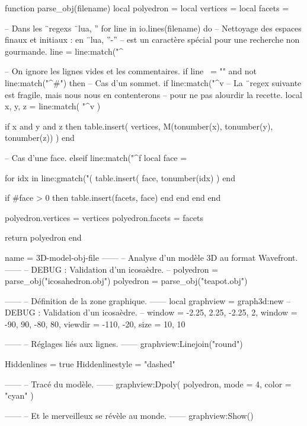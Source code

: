 \documentclass{standalone}
\begin{document}
\begin{luacode}
function parse_obj(filename)
  local polyedron = {}
  local vertices  = {}
  local facets    = {}

-- Dans les ¨regexs ¨lua, ''%
  for line in io.lines(filename) do
-- Nettoyage des espaces finaux et initiaux : en ¨lua, ''-''
-- est un caractère spécial pour une recherche non gourmande.
    line = line:match("^%

-- On ignore les lignes vides et les commentaires.
    if line ~= "" and not line:match("^#") then
-- Cas d'un sommet.
      if line:match("^v%
-- La ¨regex suivante est fragile, mais nous nous en contenterons
-- pour ne pas alourdir la recette.
        local x, y, z = line:match(
          "^v%
        )

        if x and y and z then
          table.insert(
            vertices,
            M(tonumber(x), tonumber(y), tonumber(z))
          )
        end

-- Cas d'une face.
      elseif line:match("^f%
        local face = {}

        for idx in line:gmatch("(%
          table.insert(
            face,
            tonumber(idx)
          )
        end

        if #face > 0 then
          table.insert(facets, face)
        end
      end
    end
  end

  polyedron.vertices = vertices
  polyedron.facets   = facets

  return polyedron
end
\end{luacode}


\begin{luadraw}{name = 3D-model-obj-file}
------
-- Analyse d'un modèle 3D au format Wavefront.
------
-- DEBUG : Validation d'un icosaèdre.
-- polyedron = parse_obj("icosahedron.obj")
polyedron = parse_obj("teapot.obj")

------
-- Définition de la zone graphique.
------
local graphview = graph3d:new{
-- DEBUG : Validation d'un icosaèdre.
--   window  = {-2.25, 2.25, -2.25, 2},
  window  = {-90, 90, -80, 80},
  viewdir = {-110, -20},
  size    = {10, 10}
}

------
-- Réglages liés aux lignes.
------
graphview:Linejoin("round")

Hiddenlines     = true
Hiddenlinestyle = "dashed"

------
-- Tracé du modèle.
------
graphview:Dpoly(
  polyedron,
  {
    mode  = 4,
    color = "cyan"
  })

------
-- Et le merveilleux se révèle au monde.
------
graphview:Show()
\end{luadraw}
\end{document}
